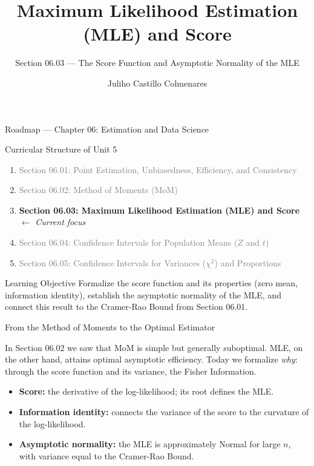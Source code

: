 \documentclass[aspectratio=169,xcolor={dvipsnames,table}]{beamer}
\title{Maximum Likelihood Estimation (MLE) and Score}
\subtitle{Section 06.03 --- The Score Function and Asymptotic Normality of the MLE}
\author[J. Castillo Colmenares]{Juliho Castillo Colmenares}
\institute[Tec de Monterrey]{Tecnologico de Monterrey}
\date{\vspace{-1.5cm}}
\begin{document}
\begin{frame}[plain]
	\titlepage
\end{frame}

\begin{frame}{Roadmap --- Chapter 06: Estimation and Data Science}
	\vspace{-0.15cm}
	\begin{block}{Curricular Structure of Unit 5}
		\footnotesize
		\begin{enumerate}\itemsep=0.03cm
			\item \textcolor{gray}{Section 06.01: Point Estimation, Unbiasedness, Efficiency, and Consistency}
			\item \textcolor{gray}{Section 06.02: Method of Moments (MoM)}
			\item \textbf{\textcolor{TecRojo}{Section 06.03: Maximum Likelihood Estimation (MLE) and Score}} $\leftarrow$ \emph{Current focus}
			\item \textcolor{gray}{Section 06.04: Confidence Intervals for Population Means ($Z$ and $t$)}
			\item \textcolor{gray}{Section 06.05: Confidence Intervals for Variances ($\chi^2$) and Proportions}
		\end{enumerate}
	\end{block}
	\vspace{-0.2cm}
	\begin{alertblock}{Learning Objective}
		\scriptsize
		Formalize the score function and its properties (zero mean, information identity), establish the asymptotic normality of the MLE, and connect this result to the Cramer-Rao Bound from Section 06.01.
	\end{alertblock}
\end{frame}

\begin{frame}{From the Method of Moments to the Optimal Estimator}
	\footnotesize
	\begin{motivacion}
		In Section 06.02 we saw that MoM is simple but generally suboptimal. MLE, on the other hand, attains optimal asymptotic efficiency. Today we formalize \emph{why}: through the score function and its variance, the Fisher Information.
	\end{motivacion}
	\vspace{0.15cm}
	\pause
	\begin{itemize}\itemsep=0.1cm
		\item \textbf{Score:} the derivative of the log-likelihood; its root defines the MLE. \pause
		\item \textbf{Information identity:} connects the variance of the score to the curvature of the log-likelihood. \pause
		\item \textbf{Asymptotic normality:} the MLE is approximately Normal for large $n$, with variance equal to the Cramer-Rao Bound.
	\end{itemize}
\end{frame}
\end{document}
